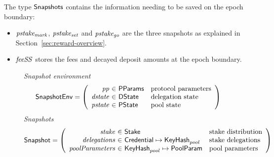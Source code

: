 The type $\mathsf{\mathsf{Snapshots}}$ contains the
information needing to be saved on the epoch boundary:
\begin{itemize}
  \item $\mathit{pstake_{mark}}$, $\mathit{pstake_{set}}$ and $\mathit{pstake_{go}}$ are the three
    snapshots as explained in Section~\ref{sec:reward-overview}.
  \item $\mathit{feeSS}$ stores the fees and decayed deposit amounts at the epoch boundary.
\end{itemize}

\begin{figure}[htb]
  \emph{Snapshot environment}
  \begin{equation*}
    \SnapshotEnv =
    \left(
      \begin{array}{r@{~\in~}ll}
        \var{pp} & \PParams & \text{protocol parameters}\\
        \var{dstate} & \DState & \text{delegation state}\\
        \var{pstate} & \PState & \text{pool state}\\
      \end{array}
    \right)
  \end{equation*}
  \emph{Snapshots}
  \begin{equation*}
    \Snapshot =
    \left(
      \begin{array}{r@{~\in~}ll}
        \var{stake} & \Stake & \text{stake distribution}\\
        \var{delegations} & \Credential\mapsto\KeyHash_{pool}
                          & \text{stake delegations}\\
        \var{poolParameters} & \KeyHash_{pool} \mapsto \PoolParam & \text{pool parameters }\\
      \end{array}
    \right)
  \end{equation*}


\end{figure}
